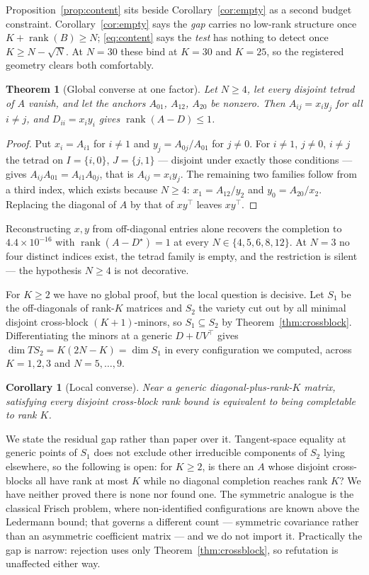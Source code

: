 \documentclass[10pt,twocolumn]{article}
\newtheorem{theorem}{Theorem}
\newtheorem{corollary}{Corollary}
\theoremstyle{remark}
\newcommand{\rank}{\operatorname{rank}}
\begin{document}
Proposition~\ref{prop:content} sits beside Corollary~\ref{cor:empty} as a
second budget constraint. Corollary~\ref{cor:empty} says the \emph{gap} carries
no low-rank structure once $K+\rank(B)\ge N$; \eqref{eq:content} says the
\emph{test} has nothing to detect once $K\ge N-\sqrt N$. At $N=30$ these bind
at $K=30$ and $K=25$, so the registered geometry clears both comfortably.

\begin{theorem}[Global converse at one factor]
\label{thm:converse1}
Let $N\ge4$, let every disjoint tetrad of $A$ vanish, and let the anchors
$A_{01}$, $A_{12}$, $A_{20}$ be nonzero. Then $A_{ij}=x_iy_j$ for all $i\ne j$,
and $D_{ii}=x_iy_i$ gives $\rank(A-D)\le1$.
\end{theorem}

\begin{proof}
Put $x_i=A_{i1}$ for $i\ne1$ and $y_j=A_{0j}/A_{01}$ for $j\ne0$. For $i\ne1$,
$j\ne0$, $i\ne j$ the tetrad on $I=\{i,0\}$, $J=\{j,1\}$ --- disjoint under
exactly those conditions --- gives $A_{ij}A_{01}=A_{i1}A_{0j}$, that is
$A_{ij}=x_iy_j$. The remaining two families follow from a third index, which
exists because $N\ge4$: $x_1=A_{12}/y_2$ and $y_0=A_{20}/x_2$. Replacing the
diagonal of $A$ by that of $xy^\top$ leaves $xy^\top$.
\end{proof}

Reconstructing $x,y$ from off-diagonal entries alone recovers the completion to
$4.4\times10^{-16}$ with $\rank(A-D^\star)=1$ at every $N\in\{4,5,6,8,12\}$. At
$N=3$ no four distinct indices exist, the tetrad family is empty, and the
restriction is silent --- the hypothesis $N\ge4$ is not decorative.

For $K\ge2$ we have no global proof, but the local question is decisive.
Let $S_1$ be the off-diagonals of rank-$K$ matrices and $S_2$ the variety cut
out by all minimal disjoint cross-block $(K+1)$-minors, so
$S_1\subseteq S_2$ by Theorem~\ref{thm:crossblock}. Differentiating the minors
at a generic $D+UV^\top$ gives $\dim T S_2=K(2N-K)=\dim S_1$ in every
configuration we computed, across $K=1,2,3$ and $N=5,\dots,9$.

\begin{corollary}[Local converse]
\label{cor:localconverse}
Near a generic diagonal-plus-rank-$K$ matrix, satisfying every disjoint
cross-block rank bound is equivalent to being completable to rank $K$.
\end{corollary}

We state the residual gap rather than paper over it. Tangent-space equality at
generic points of $S_1$ does not exclude other irreducible components of $S_2$
lying elsewhere, so the following is open: for $K\ge2$, is there an $A$ whose
disjoint cross-blocks all have rank at most $K$ while no diagonal completion
reaches rank $K$? We have neither proved there is none nor found one. The
symmetric analogue is the classical Frisch problem, where non-identified
configurations are known above the Ledermann bound; that governs a different
count --- symmetric covariance rather than an asymmetric coefficient matrix ---
and we do not import it. Practically the gap is narrow: rejection uses only
Theorem~\ref{thm:crossblock}, so refutation is unaffected either way.
\end{document}
